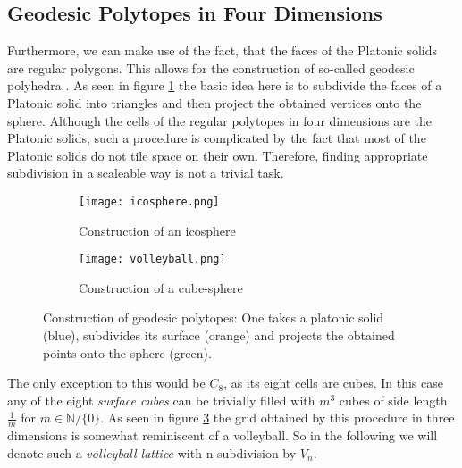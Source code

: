 \subsection{Geodesic Polytopes in Four Dimensions}

Furthermore, we can make use of the fact, that the faces of the Platonic solids are regular polygons. This allows for the construction of so-called geodesic polyhedra \cite{Wenniger:1999}. As seen in figure \ref{fig:icospherePic} the basic idea here is to subdivide the faces of a Platonic solid into triangles and then project the obtained vertices onto the sphere. Although the cells of the regular polytopes in four dimensions are the Platonic solids, such a procedure is complicated by the fact that most of the Platonic solids do not tile space on their own. Therefore, finding appropriate subdivision in a scaleable way is not a trivial task.\\

\begin{figure}
 \centering
 \begin{subfigure}{0.9\textwidth}
  \texttt{[image: icosphere.png]}
  \caption{Construction of an icosphere}
  \label{fig:icospherePic}
 \end{subfigure}
 \begin{subfigure}{0.9\textwidth}
  \texttt{[image: volleyball.png]}
  \caption{Construction of a cube-sphere}
  \label{fig:volleyPic}
 \end{subfigure}
 \caption{Construction of geodesic polytopes: One takes a platonic solid (blue), subdivides its surface (orange) and projects the obtained points onto the sphere (green).}
\end{figure}

The only exception to this would be $C_8$, as its eight cells are cubes. In this case any of the eight \emph{surface cubes} can be trivially filled with $m^3$ cubes of side length $\frac{1}{m}$ for $m \in \mathbb{N}/\{0\}$. As seen in figure \ref{fig:volleyPic} the grid obtained by this procedure in three dimensions is somewhat reminiscent of a volleyball. So in the following we will denote such a \emph{volleyball lattice} with n subdivision by $V_n$. \\

